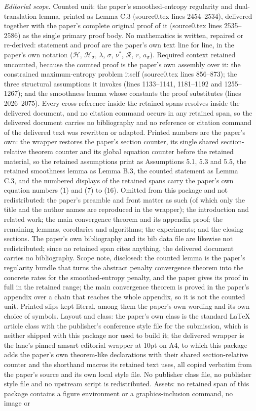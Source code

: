 \documentclass[10pt,a4paper]{amsart}
\def\HH{{\mathcal{H}}}
\def\Reg{{\mathcal{R}}}
\def\nuOpt{{\nu^{*}}}
\theoremstyle{plain}
\theoremstyle{definition}
\theoremstyle{remark}
\begin{document}
\noindent\textit{Editorial scope.} Counted unit: the paper's smoothed-entropy regularity and dual-translation lemma, printed as Lemma C.3 (source0.tex lines 2454--2534), delivered together with the paper's complete original proof of it (source0.tex lines 2535--2586) as the single primary proof body. No mathematics is written, repaired or re-derived: statement and proof are the paper's own text line for line, in the paper's own notation ($\HH$, $\HH_\sigma$, $\lambda$, $\sigma$, $\nuOpt$, $\Reg$, $r$, $a_\sigma$). Required context retained uncounted, because the counted proof is the paper's own assembly over it: the constrained maximum-entropy problem itself (source0.tex lines 856--873); the three structural assumptions it invokes (lines 1133--1141, 1181--1192 and 1255--1267); and the smoothness lemma whose constants the proof substitutes (lines 2026--2075). Every cross-reference inside the retained spans resolves inside the delivered document, and no citation command occurs in any retained span, so the delivered document carries no bibliography and no reference or citation command of the delivered text was rewritten or adapted. Printed numbers are the paper's own: the wrapper restores the paper's section counter, its single shared section-relative theorem counter and its global equation counter before the retained material, so the retained assumptions print as Assumptions 5.1, 5.3 and 5.5, the retained smoothness lemma as Lemma B.3, the counted statement as Lemma C.3, and the numbered displays of the retained spans carry the paper's own equation numbers (1) and (7) to (16). Omitted from this package and not redistributed: the paper's preamble and front matter as such (of which only the title and the author names are reproduced in the wrapper); the introduction and related work; the main convergence theorem and its appendix proof; the remaining lemmas, corollaries and algorithms; the experiments; and the closing sections. The paper's own bibliography and its bib data file are likewise not redistributed; since no retained span cites anything, the delivered document carries no bibliography. Scope note, disclosed: the counted lemma is the paper's regularity bundle that turns the abstract penalty convergence theorem into the concrete rates for the smoothed-entropy penalty, and the paper gives its proof in full in the retained range; the main convergence theorem is proved in the paper's appendix over a chain that reaches the whole appendix, so it is not the counted unit. Printed slips kept literal, among them the paper's own wording and its own choice of symbols. Layout and class: the paper's own class is the standard LaTeX article class with the publisher's conference style file for the submission, which is neither shipped with this package nor used to build it; the delivered wrapper is the lane's pinned amsart editorial wrapper at 10pt on A4, to which this package adds the paper's own theorem-like declarations with their shared section-relative counter and the shorthand macros its retained text uses, all copied verbatim from the paper's source and its own local style file. No publisher class file, no publisher style file and no upstream script is redistributed. Assets: no retained span of this package contains a figure environment or a graphics-inclusion command, no image or 
\end{document}
